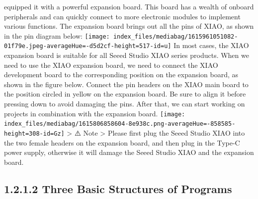 \documentclass[
  letterpaper,
  DIV=11,
  numbers=noendperiod]{scrreprt}
\begin{document}
equipped it with a powerful expansion board. This board has a wealth of
onboard peripherals and can quickly connect to more electronic modules
to implement various functions. The expansion board brings out all the
pins of XIAO, as shown in the pin diagram below:
\texttt{[image: index\_files/mediabag/1615961051082-01f79e.jpeg-averageHue=-d5d2cf-height=517-id=u]}
In most cases, the XIAO expansion board is suitable for all Seeed Studio
XIAO series products. When we need to use the XIAO expansion board, we
need to connect the XIAO development board to the corresponding position
on the expansion board, as shown in the figure below. Connect the pin
headers on the XIAO main board to the position circled in yellow on the
expansion board. Be sure to align it before pressing down to avoid
damaging the pins. After that, we can start working on projects in
combination with the expansion board.
\texttt{[image: index\_files/mediabag/1615806858604-8e938c.png-averageHue=-858585-height=308-id=Gz]}
\textgreater{} ⚠️ Note \textgreater{} Please first plug the Seeed Studio
XIAO into the two female headers on the expansion board, and then plug
in the Type-C power supply, otherwise it will damage the Seeed Studio
XIAO and the expansion board.

\hypertarget{three-basic-structures-of-programs}{%
\subsection*{1.2.1.2 Three Basic Structures of
Programs}\label{three-basic-structures-of-programs}}
\end{document}
